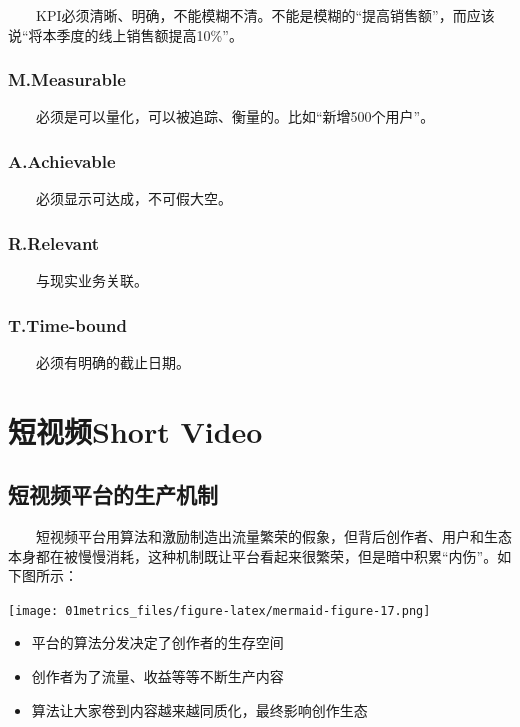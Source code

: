 \documentclass[
  letterpaper,
  DIV=11,
  numbers=noendperiod]{scrreprt}
\begin{document}
  KPI必须清晰、明确，不能模糊不清。不能是模糊的``提高销售额''，而应该说``将本季度的线上销售额提高10\%''。

\subsubsection{M.Measurable}\label{m.measurable}

  必须是可以量化，可以被追踪、衡量的。比如``新增500个用户''。

\subsubsection{A.Achievable}\label{a.achievable}

  必须显示可达成，不可假大空。

\subsubsection{R.Relevant}\label{r.relevant}

  与现实业务关联。

\subsubsection{T.Time-bound}\label{t.time-bound}

  必须有明确的截止日期。

\section{短视频Short Video}\label{ux77edux89c6ux9891short-video}

\subsection{短视频平台的生产机制}\label{ux77edux89c6ux9891ux5e73ux53f0ux7684ux751fux4ea7ux673aux5236}

  短视频平台用算法和激励制造出流量繁荣的假象，但背后创作者、用户和生态本身都在被慢慢消耗，这种机制既让平台看起来很繁荣，但是暗中积累``内伤''。如下图所示：

\texttt{[image: 01metrics\_files/figure-latex/mermaid-figure-17.png]}

\begin{itemize}
\item
  平台的算法分发决定了创作者的生存空间
\item
  创作者为了流量、收益等等不断生产内容
\item
  算法让大家卷到内容越来越同质化，最终影响创作生态
\end{itemize}
\end{document}
